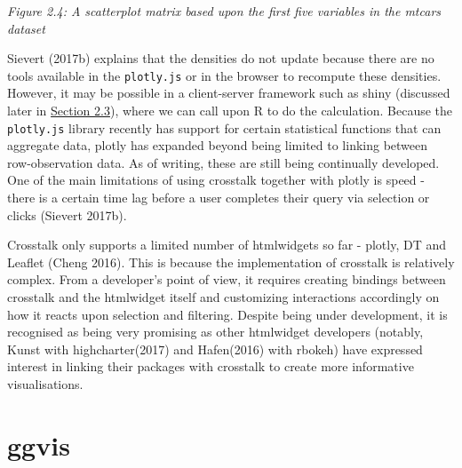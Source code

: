 \documentclass[11pt,]{report}
\newenvironment{Shaded}{\begin{snugshade}}{\end{snugshade}}
\newcommand{\KeywordTok}[1]{\textcolor[rgb]{0.13,0.29,0.53}{\textbf{#1}}}
\newcommand{\DataTypeTok}[1]{\textcolor[rgb]{0.13,0.29,0.53}{#1}}
\newcommand{\DecValTok}[1]{\textcolor[rgb]{0.00,0.00,0.81}{#1}}
\newcommand{\StringTok}[1]{\textcolor[rgb]{0.31,0.60,0.02}{#1}}
\newcommand{\OperatorTok}[1]{\textcolor[rgb]{0.81,0.36,0.00}{\textbf{#1}}}
\newcommand{\NormalTok}[1]{#1}
\begin{document}
\begin{Shaded}
\end{Shaded}

\emph{Figure 2.4: A scatterplot matrix based upon the first five
variables in the mtcars dataset}

Sievert (2017b) explains that the densities do not update because there
are no tools available in the \texttt{plotly.js} or in the browser to
recompute these densities. However, it may be possible in a
client-server framework such as \textsf{shiny} (discussed later in
\protect\hyperlink{shiny}{Section 2.3}), where we can call upon R to do
the calculation. Because the \texttt{plotly.js} library recently has
support for certain statistical functions that can aggregate data,
\textsf{plotly} has expanded beyond being limited to linking between
row-observation data. As of writing, these are still being continually
developed. One of the main limitations of using crosstalk together with
plotly is speed - there is a certain time lag before a user completes
their query via selection or clicks (Sievert 2017b).

Crosstalk only supports a limited number of htmlwidgets so far -
\textsf{plotly}, \textsf{DT} and \textsf{Leaflet} (Cheng 2016). This is
because the implementation of crosstalk is relatively complex. From a
developer's point of view, it requires creating bindings between
\textsf{crosstalk} and the htmlwidget itself and customizing
interactions accordingly on how it reacts upon selection and filtering.
Despite being under development, it is recognised as being very
promising as other htmlwidget developers (notably, Kunst with
\textsf{highcharter}(2017) and Hafen(2016) with \textsf{rbokeh}) have
expressed interest in linking their packages with crosstalk to create
more informative visualisations.

\section{ggvis}\label{ggvis}
\end{document}
